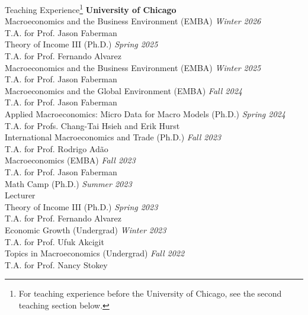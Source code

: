 \documentclass{resume} %
\begin{document}
		\begin{rSection}{Teaching Experience\footnote{For teaching experience before the University of Chicago, see the second teaching section below.}}
			\textbf{University of Chicago}\\
			Macroeconomics and the Business Environment (EMBA) \hfill {\em Winter 2026}\\[-0.25em]
			{\small T.A. for Prof. Jason Faberman}\\[0.35em]
			Theory of Income III (Ph.D.) \hfill {\em Spring 2025}\\[-0.25em]
			{\small T.A. for Prof. Fernando Alvarez}\\[0.35em]
			Macroeconomics and the Business Environment (EMBA) \hfill {\em Winter 2025}\\[-0.25em]
			{\small T.A. for Prof. Jason Faberman}\\[0.35em]
			Macroeconomics and the Global Environment (EMBA) \hfill {\em Fall 2024}\\[-0.25em]
			{\small T.A. for Prof. Jason Faberman}\\[0.35em]
			Applied Macroeconomics: Micro Data for Macro Models (Ph.D.) \hfill {\em Spring 2024}\\[-0.25em]
			{\small T.A. for Profs. Chang-Tai Hsieh and Erik Hurst}\\[0.35em]
			International Macroeconomics and Trade (Ph.D.) \hfill {\em Fall 2023}\\[-0.25em]
			{\small T.A. for Prof. Rodrigo Adão}\\[0.35em]
			Macroeconomics (EMBA) \hfill {\em Fall 2023}\\[-0.25em]
			{\small T.A. for Prof. Jason Faberman}\\[0.35em]
			Math Camp (Ph.D.) \hfill {\em Summer 2023}\\[-0.25em]
			{\small Lecturer}\\[0.35em]
			Theory of Income III (Ph.D.) \hfill {\em Spring 2023}\\[-0.25em]
			{\small T.A. for Prof. Fernando Alvarez}\\[0.35em]
			Economic Growth (Undergrad) \hfill {\em Winter 2023}\\[-0.25em]
			{\small T.A. for Prof. Ufuk Akcigit}\\[0.35em]
			Topics in Macroeconomics (Undergrad) \hfill {\em Fall 2022}\\[-0.25em]
			{\small T.A. for Prof. Nancy Stokey}
	\end{rSection}
\end{document}
